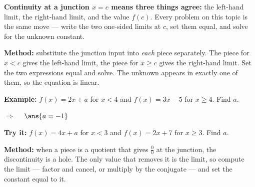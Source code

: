 \documentclass[12pt]{article}
\begin{document}

\begin{formulabox}
\textbf{Continuity at a junction $x = c$ means three things agree:} the
left-hand limit, the right-hand limit, and the value $f(c)$. Every problem on
this topic is the same move --- write the two one-sided limits at $c$, set them
equal, and solve for the unknown constant.
\end{formulabox}


\begin{formulabox}
\textbf{Method:} substitute the junction input into \emph{each} piece
separately. The piece for $x < c$ gives the left-hand limit, the piece for
$x \ge c$ gives the right-hand limit. Set the two expressions equal and solve.
The unknown appears in exactly one of them, so the equation is linear.
\end{formulabox}

\begin{examplebox}
\textbf{Example:} \quad $f(x) = 2x + a$ for $x < 4$ and $f(x) = 3x - 5$ for
$x \ge 4$. Find $a$.

$\Rightarrow\quad$ $\ans{a = -1}$
\end{examplebox}

\begin{tryitbox}
\textbf{Try it:} \quad $f(x) = 4x + a$ for $x < 3$ and $f(x) = 2x + 7$ for
$x \ge 3$. Find $a$.\\[2pt]
\end{tryitbox}


\begin{formulabox}
\textbf{Method:} when a piece is a quotient that gives $\frac{0}{0}$ at the
junction, the discontinuity is a hole. The only value that removes it is the
limit, so compute the limit --- factor and cancel, or multiply by the conjugate
--- and set the constant equal to it.
\end{formulabox}
\end{document}
